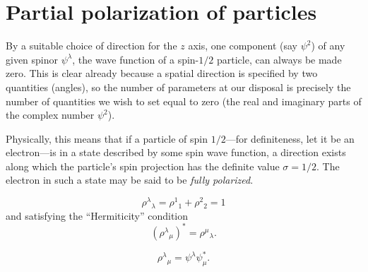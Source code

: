 \section{Partial polarization of particles}

By a suitable choice of direction for the $z$ axis, one component (say $\psi^2$) of any given spinor $\psi^\lambda$, the wave function of a spin-$1/2$ particle, can always be made zero. This is clear already because a spatial direction is specified by two quantities (angles), so the number of parameters at our disposal is precisely the number of quantities we wish to set equal to zero (the real and imaginary parts of the complex number $\psi^2$).

Physically, this means that if a particle of spin $1/2$---for definiteness, let it be an electron---is in a state described by some spin wave function, a direction exists along which the particle's spin projection has the definite value $\sigma=1/2$. The electron in such a state may be said to be \emph{fully polarized}.


\begin{equation}
 \rho^\lambda{}_\lambda=\rho^1{}_1+\rho^2{}_2=1
 \tag{59.1}
\end{equation}
and satisfying the ``Hermiticity'' condition
\begin{equation}
 (\rho^\lambda{}_\mu)^*=\rho^\mu{}_\lambda.
 \tag{59.2}
\end{equation}

\begin{equation}
 \rho^\lambda{}_\mu=\psi^\lambda\psi_\mu^*.
 \tag{59.3}
\end{equation}

